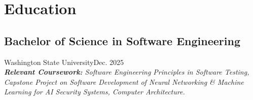 \section{Education}
\subsection{Bachelor of Science in Software Engineering}{Washington State University}{Dec. 2025}
\\ \textit{\textbf{Relevant Coursework:} Software Engineering Principles in Software Testing, Capstone Project on Software Development of Neural Networking & Machine Learning for AI Security Systems, Computer Architecture.}
\vspace{0.2em}
